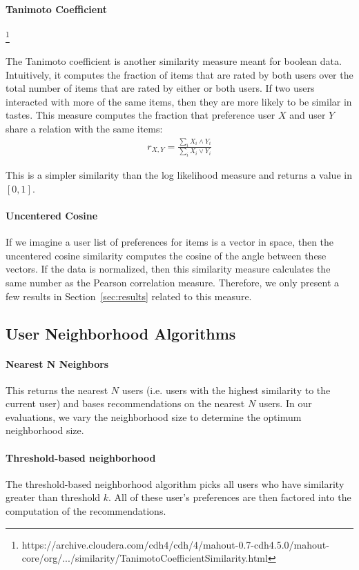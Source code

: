 \documentclass{article}
\begin{document}
\paragraph{Tanimoto Coefficient}\footnote{https://archive.cloudera.com/cdh4/cdh/4/mahout-0.7-cdh4.5.0/mahout-core/org/.../similarity/TanimotoCoefficientSimilarity.html}

The Tanimoto coefficient is another similarity measure meant for boolean
data. Intuitively, it computes the fraction of items that are rated
by both users over the total number of items that are rated by 
either or both users. If two users interacted with more of the
same items, then they are more likely to be similar in tastes. This measure computes the
fraction that preference user $X$ and user $Y$ share a relation with the same items:\begin{align*}
r_{X, Y} = \frac{\sum_i X_i \wedge Y_i}{\sum_i X_i \vee Y_i}
\end{align*}

This is a simpler similarity than the log likelihood measure and returns a value in $[0, 1]$. 

\paragraph{Uncentered Cosine}

If we imagine a user list of preferences for items is a vector in space, then the uncentered cosine similarity computes
the cosine of the angle between these vectors. If the data is normalized, then this similarity measure calculates the
same number as the Pearson correlation measure. Therefore, we only present a few results in Section~\ref{sec:results} related to this measure.

\subsection{User Neighborhood Algorithms}

\paragraph{Nearest N Neighbors} This returns the nearest $N$ users (i.e. users with the highest similarity to the current
user) and bases recommendations on the nearest $N$ users. In our evaluations, we vary the neighborhood size to 
determine the optimum neighborhood size. 

\paragraph{Threshold-based neighborhood} The threshold-based neighborhood algorithm picks all users who have similarity greater than threshold $k$. All of these user's preferences are then factored into the computation of the recommendations.
\end{document}
